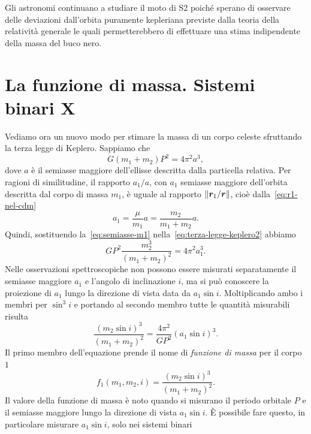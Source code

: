 Gli astronomi continuano a studiare il moto di S2 poiché sperano di osservare
delle deviazioni dall'orbita puramente kepleriana previste dalla teoria della
relatività generale le quali permetterebbero di effettuare una stima
indipendente della massa del buco nero.

\section{La funzione di massa. Sistemi binari X}
\label{sec:funzione-massa}

Vediamo ora un nuovo modo per stimare la massa di un corpo celeste sfruttando la
terza legge di Keplero. Sappiamo che
\begin{equation}
  \label{eq:terza-legge-keplero2}
  G(m_1 + m_2)  P^2 = 4\pi^2a^3,
\end{equation}
dove $a$ è il semiasse maggiore dell'ellisse descritta dalla particella
relativa. Per ragioni di similitudine, il rapporto $a_1/a$, con $a_1$ semiasse
maggiore dell'orbita descritta dal corpo di massa $m_1$, è uguale al rapporto
$\lVert\bm{r}_1/\bm{r}\rVert$, cioè dalla~\eqref{eq:r1-nel-cdm}
\begin{equation}
  \label{eq:semiasse-m1}
  a_1 = \frac{\mu}{m_1}a = \frac{m_2}{m_1 + m_2}a.
\end{equation}
Quindi, sostituendo la~\eqref{eq:semiasse-m1}
nella~\eqref{eq:terza-legge-keplero2} abbiamo
\begin{equation}
  GP^2\frac{m_2^3}{(m_1 + m_2)^2} = 4\pi^2a_1^3.
\end{equation}
Nelle osservazioni spettroscopiche non possono essere misurati separatamente il
semiasse maggiore $a_1$ e l'angolo di inclinazione $i$, ma si può conoscere la
proiezione di $a_1$ lungo la direzione di vista data da $a_1\sin
i$. Moltiplicando ambo i membri per $\sin^3 i$ e portando al secondo membro
tutte le quantità misurabili risulta
\begin{equation}
  \label{eq:valore-funzione-massa}
  \frac{(m_2\sin i)^3}{(m_1 + m_2)^2} = \frac{4\pi^2}{GP^2}(a_1\sin i)^3.
\end{equation}
Il primo membro dell'equazione prende il nome di \emph{funzione di massa} per il
corpo $1$
\begin{equation}
  f_1(m_1,m_2,i) = \frac{(m_2\sin i)^3}{(m_1 + m_2)^2}.
\end{equation}
Il valore della funzione di massa è noto quando si misurano il periodo orbitale
$P$ e il semiasse maggiore lungo la direzione di vista $a_1\sin i$. È possibile
fare questo, in particolare misurare $a_1\sin i$, solo nei sistemi binari
